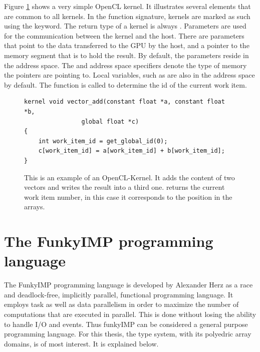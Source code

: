 Figure \ref{fig:theory_opencl_kernel} shows a very simple OpenCL kernel. It illustrates several elements that are common to all kernels. In the function signature, kernels are marked as such using the  keyword. The return type of a kernel is always . Parameters are used for the communication between the kernel and the host. There are parameters that point to the data transferred to the GPU by the host, and a pointer to the memory segment that is to hold the result. By default, the parameters reside in the  address space. The  and  address space specifiers denote the type of memory the pointers are pointing to. Local variables, such as  are also in the  address space by default. The function  is called to determine the id of the current work item. \cite{khronos2012specification} %


\begin{figure}[hb]
	\lstset{language=c}
	\begin{lstlisting}
kernel void vector_add(constant float *a, constant float *b, 
				global float *c)
{
	int work_item_id = get_global_id(0);
	c[work_item_id] = a[work_item_id] + b[work_item_id];
}
	\end{lstlisting}
	\caption{This is an example of an OpenCL-Kernel. It adds the content of two vectors and writes the result into a third one.  returns the current work item number, in this case it corresponds to the position in the arrays.}
	\label{fig:theory_opencl_kernel}
\end{figure}
\newpage



\section{The FunkyIMP programming language}
\label{sect:theory_funky}
The FunkyIMP programming language is developed by Alexander Herz as a race and deadlock-free, implicitly parallel, functional programming language. It employs task as well as data parallelism in order to maximize the number of computations that are executed in parallel. This is done without losing the ability to handle I/O and events. Thus funkyIMP can be considered a general purpose programming language. For this thesis, the type system, with its polyedric array domains, is of most interest. It is explained below. \cite{herz2013funkywiki} \\ %

